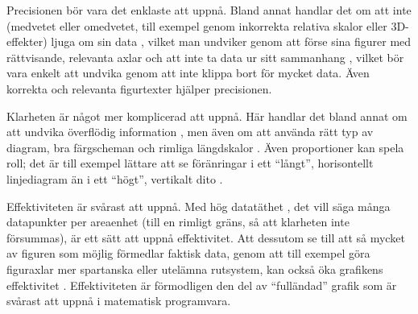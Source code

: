 \documentclass[10pt,../../a4.tex]{subfiles}
\begin{document}
Precisionen bör vara det enklaste att uppnå. 
Bland annat handlar det om att inte (medvetet eller omedvetet, till
exempel genom inkorrekta relativa skalor eller 3D-effekter)
ljuga om sin data \parencite[\ppno~57\psqq]{Tufte01},
vilket man undviker genom att förse sina figurer med rättvisande,
relevanta axlar och att inte ta data ur sitt sammanhang
\parencite[\ppno~75\psq]{Tufte01}, vilket bör vara enkelt att undvika
genom att inte klippa bort för mycket data.
Även korrekta och relevanta figurtexter hjälper precisionen.

Klarheten är något mer komplicerad att uppnå. Här handlar det bland annat
om att undvika överflödig information , men även om att
använda rätt typ av diagram, bra färgscheman
\parencite[\ppno~75–77]{Tufte97} och rimliga längdskalor
\parencite[\ppno~20–23]{Tufte97}. Även proportioner kan spela roll;
det är till exempel lättare att se föränringar i ett \enquote{långt},
horisontellt linjediagram än i ett \enquote{högt}, vertikalt dito
\parencite[\ppno~186\psq]{Tufte01}.

Effektiviteten är svårast att uppnå. Med hög datatäthet
\parencite[\pno~162]{Tufte01}, det vill säga många datapunkter per
areaenhet (till en rimligt gräns, så att klarheten inte försummas), är
ett sätt att uppnå effektivitet. Att dessutom se till att så mycket av figuren som möjlig förmedlar faktisk data, genom att till exempel göra
figuraxlar mer spartanska eller utelämna rutsystem, kan också öka
grafikens effektivitet \parencite[\ppno~123\psqq]{Tufte01}. 
Effektiviteten är förmodligen den del av \enquote{fulländad} grafik
som är svårast att uppnå i matematisk programvara.
\end{document}
